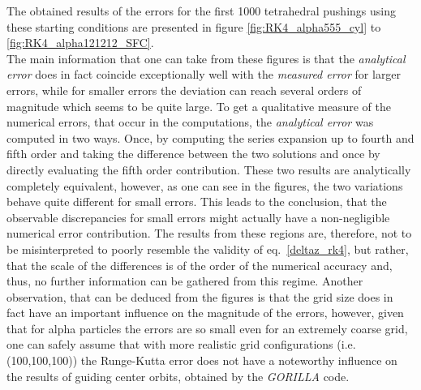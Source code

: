 \documentclass[./main.tex]{subfiles}
\begin{document}
The obtained results of the errors for the first 1000 tetrahedral pushings using these starting conditions are presented in figure \ref{fig:RK4_alpha555_cyl} to \ref{fig:RK4_alpha121212_SFC}.\\
The main information that one can take from these figures is that the \textit{analytical error} does in fact coincide exceptionally well with the \textit{measured error} for larger errors, while for smaller errors the deviation can reach several orders of magnitude which seems to be quite large. To get a qualitative measure of the numerical errors, that occur in the computations, the \textit{analytical error} was computed in two ways. Once, by computing the series expansion up to fourth and fifth order and taking the difference between the two solutions and once by directly evaluating the fifth order contribution. These two results are analytically completely equivalent, however, as one can see in the figures, the two variations behave quite different for small errors. This leads to the conclusion, that the observable discrepancies for small errors might actually have a non-negligible numerical error contribution. The results from these regions are, therefore, not to be misinterpreted to poorly resemble the validity of eq.~\eqref{deltaz_rk4}, but rather, that the scale of the differences is of the order of the numerical accuracy and, thus, no further information can be gathered from this regime. Another observation, that can be deduced from the figures is that the grid size does in fact have an important influence on the magnitude of the errors, however, given that for alpha particles the errors are so small even for an extremely coarse grid, one can safely assume that with more realistic grid configurations (i.e. (100,100,100)) the Runge-Kutta error does not have a noteworthy influence on the results of guiding center orbits, obtained by the \textit{GORILLA} code.
\end{document}
